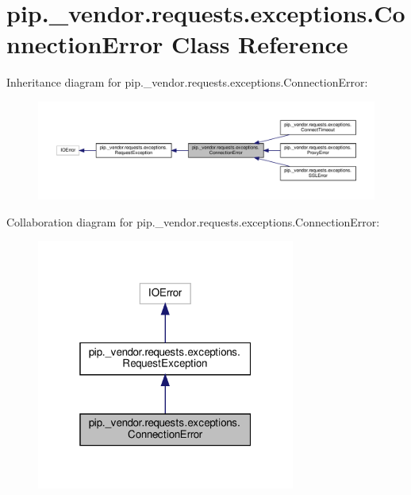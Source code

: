 \hypertarget{classpip_1_1__vendor_1_1requests_1_1exceptions_1_1ConnectionError}{}\section{pip.\+\_\+vendor.\+requests.\+exceptions.\+Connection\+Error Class Reference}
\label{classpip_1_1__vendor_1_1requests_1_1exceptions_1_1ConnectionError}


Inheritance diagram for pip.\+\_\+vendor.\+requests.\+exceptions.\+Connection\+Error\+:
\nopagebreak
\begin{figure}[H]
\begin{center}
\leavevmode
\includegraphics[width=350pt]{classpip_1_1__vendor_1_1requests_1_1exceptions_1_1ConnectionError__inherit__graph}
\end{center}
\end{figure}


Collaboration diagram for pip.\+\_\+vendor.\+requests.\+exceptions.\+Connection\+Error\+:
\nopagebreak
\begin{figure}[H]
\begin{center}
\leavevmode
\includegraphics[width=241pt]{classpip_1_1__vendor_1_1requests_1_1exceptions_1_1ConnectionError__coll__graph}
\end{center}
\end{figure}
